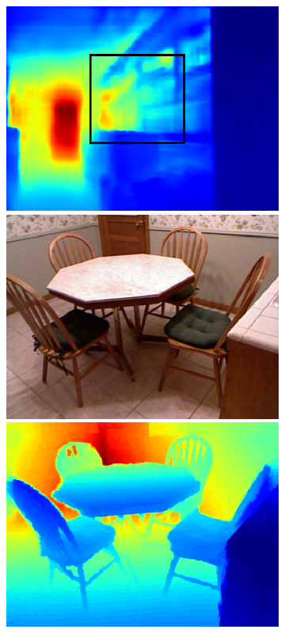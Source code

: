 \begin{figure}[htb]
\begin{subfigure}{0.15\linewidth}
\begin{minipage}[t]{1\linewidth}
  \includegraphics[width=1\linewidth]{figure/nyu_without/office_rgb_00015.png}
  \includegraphics[width=1\linewidth]{figure/nyu_rgb/760.png}
  \includegraphics[width=1\linewidth]{figure/nyu_gt/760.png}

\end{minipage}
\end{subfigure}
\end{figure}
